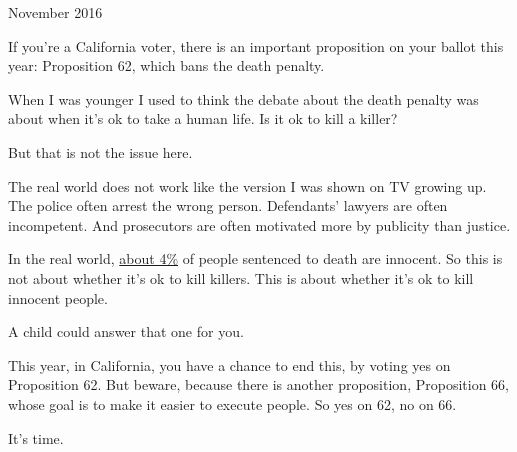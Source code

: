 November 2016

If you're a California voter, there is an important proposition on your
ballot this year: Proposition 62, which bans the death penalty.

When I was younger I used to think the debate about the death penalty
was about when it's ok to take a human life. Is it ok to kill a killer?

But that is not the issue here.

The real world does not work like the version I was shown on TV growing
up. The police often arrest the wrong person. Defendants' lawyers are
often incompetent. And prosecutors are often motivated more by publicity
than justice.

In the real world,
\href{http://time.com/79572/more-innocent-people-on-death-row-than-estimated-study/}{about
4\%} of people sentenced to death are innocent. So this is not about
whether it's ok to kill killers. This is about whether it's ok to kill
innocent people.

A child could answer that one for you.

This year, in California, you have a chance to end this, by voting yes
on Proposition 62. But beware, because there is another proposition,
Proposition 66, whose goal is to make it easier to execute people. So
yes on 62, no on 66.

It's time.
